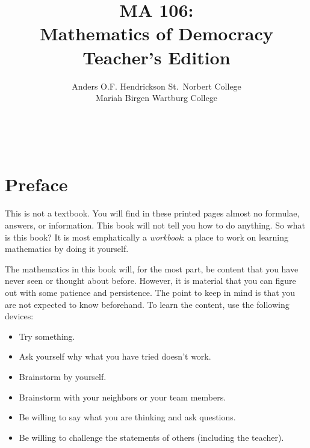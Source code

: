 \documentclass[12pt,leqno]{book}
\title{MA 106: \\ Mathematics of Democracy \\ \ifsolns Teacher's Edition \fi}
\author{Anders O.F. Hendrickson \qquad
        St.~Norbert College  \\
        Mariah Birgen \qquad
				Wartburg College}
\date{\theterm{} \theyear}
\begin{document}


\frontmatter
	\thispagestyle{empty}
	\vfill
	\maketitle
%
	\vfill
	\clearpage

\pagestyle{empty}
~\clearpage

		\thispagestyle{empty}
\tableofcontents*


\chapter*{Preface}\normalsize

This is not a textbook.
You will find in these printed pages almost no formulae, answers, or information.
This book will not tell you how to do anything.
So what is this book?
It is most emphatically a \emph{workbook}: a place to work on learning mathematics by doing it yourself.

The mathematics in this book will, for the most part, be content that you have never seen or thought about before.  However, it is material that you can figure out with some patience and persistence.  The point to keep in mind is that you are not expected to know beforehand.  To learn the content, use the following devices:
\begin{itemize}
	\item Try something.
	\item Ask yourself why what you have tried doesn't work.
	\item Brainstorm by yourself.
	\item Brainstorm with your neighbors or your team members.
	\item Be willing to say what you are thinking and ask questions.
	\item Be willing to challenge the statements of others (including the teacher).
\end{itemize}
\end{document}
